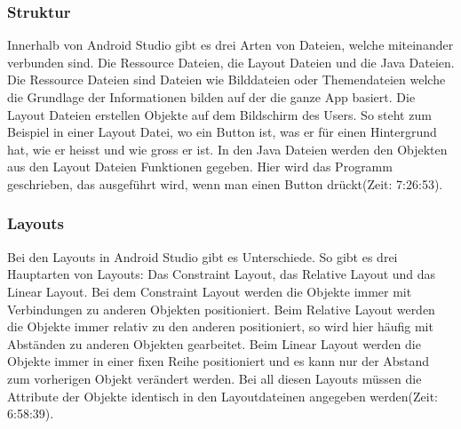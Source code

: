 \subsubsection{Struktur}
Innerhalb von Android Studio gibt es drei Arten von Dateien, welche miteinander verbunden sind. Die Ressource Dateien, die Layout Dateien und die Java Dateien. Die Ressource Dateien sind Dateien wie Bilddateien oder Themendateien welche die Grundlage der Informationen bilden auf der die ganze App basiert. Die Layout Dateien erstellen Objekte auf dem Bildschirm des Users. So steht zum Beispiel in einer Layout Datei, wo ein Button ist, was er für einen Hintergrund hat, wie er heisst und wie gross er ist. In den Java Dateien werden den Objekten aus den Layout Dateien Funktionen gegeben. Hier wird das Programm geschrieben, das ausgeführt wird, wenn man einen Button drückt\cite{freecodecamporg_android_2020}(Zeit: 7:26:53).

\subsubsection{Layouts}
Bei den Layouts in Android Studio gibt es Unterschiede. So gibt es drei Hauptarten von Layouts: Das Constraint Layout, das Relative Layout und das Linear Layout. Bei dem Constraint Layout werden die Objekte immer mit Verbindungen zu anderen Objekten positioniert. Beim Relative Layout werden die Objekte immer relativ zu den anderen positioniert, so wird hier häufig mit Abständen zu anderen Objekten gearbeitet. Beim Linear Layout werden die Objekte immer in einer fixen Reihe positioniert und es kann nur der Abstand zum vorherigen Objekt verändert werden. Bei all diesen Layouts müssen die Attribute der Objekte identisch in den Layoutdateinen angegeben werden\cite{freecodecamporg_android_2020}(Zeit: 6:58:39).
\newpage
